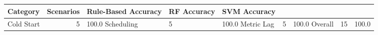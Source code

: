 \begin{tabular}{lrlll}
\toprule
Category & Scenarios & Rule-Based Accuracy & RF Accuracy & SVM Accuracy \\
\midrule
Cold Start & 5 & 100.0%
Scheduling & 5 & 100.0%
Metric Lag & 5 & 100.0%
Overall & 15 & 100.0%
\bottomrule
\end{tabular}
